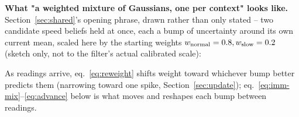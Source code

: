 \documentclass[11pt,a4paper]{article}
\begin{document}
\textbf{What "a weighted mixture of Gaussians, one per context" looks like.} Section~\ref{sec:shared}'s opening phrase, drawn rather than only stated -- two candidate speed beliefs held at once, each a bump of uncertainty around its own current mean, scaled here by the starting weights $w_{\rm normal}=0.8,w_{\rm slow}=0.2$ (sketch only, not to the filter's actual calibrated scale):
\begin{center}
\end{center}
As readings arrive, eq.~\eqref{eq:reweight} shifts weight toward whichever bump better predicts them (narrowing toward one spike, Section~\ref{sec:update}); eq.~\eqref{eq:imm-mix}--\eqref{eq:advance} below is what moves and reshapes each bump between readings.
\end{document}
